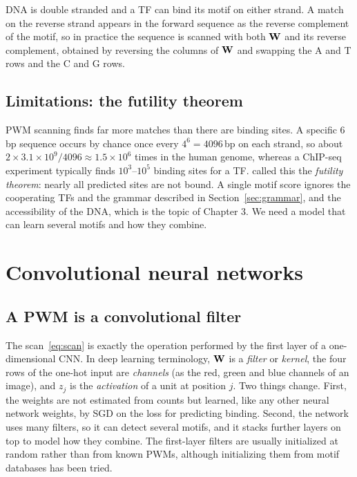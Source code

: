 DNA is double stranded and a TF can bind its motif on either strand. A match on the reverse strand appears in the forward sequence as the reverse complement of the motif, so in practice the sequence is scanned with both $\mathbf{W}$ and its reverse complement, obtained by reversing the columns of $\mathbf{W}$ and swapping the A and T rows and the C and G rows.

\subsection{Limitations: the futility theorem}

PWM scanning finds far more matches than there are binding sites. A specific 6\,bp sequence occurs by chance once every $4^6=4096$\,bp on each strand, so about $2\times3.1\times10^9/4096\approx1.5\times10^6$ times in the human genome, whereas a ChIP-seq experiment typically finds $10^3$--$10^5$ binding sites for a TF. \citet{wasserman2004} called this the \emph{futility theorem}: nearly all predicted sites are not bound. A single motif score ignores the cooperating TFs and the grammar described in Section~\ref{sec:grammar}, and the accessibility of the DNA, which is the topic of Chapter 3. We need a model that can learn several motifs and how they combine.

\section{Convolutional neural networks}
\label{sec:cnn}

\subsection{A PWM is a convolutional filter}

The scan~\eqref{eq:scan} is exactly the operation performed by the first layer of a one-dimensional CNN. In deep learning terminology, $\mathbf{W}$ is a \emph{filter} or \emph{kernel}, the four rows of the one-hot input are \emph{channels} (as the red, green and blue channels of an image), and $z_j$ is the \emph{activation} of a unit at position $j$. Two things change. First, the weights are not estimated from counts but learned, like any other neural network weights, by SGD on the loss for predicting binding. Second, the network uses many filters, so it can detect several motifs, and it stacks further layers on top to model how they combine. The first-layer filters are usually initialized at random rather than from known PWMs, although initializing them from motif databases has been tried.

